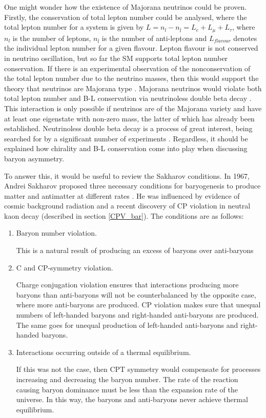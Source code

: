 \documentclass[10pt]{article}
\begin{document}
One might wonder how the existence of Majorana neutrinos could be proven. Firstly, the conservation of total lepton number could be analysed, where the total lepton number for a system is given by $L = n_l - n_{\bar{l}} = L_e + L_{\mu} + L_{\tau}$, where $n_l$ is the number of leptons, $n_{\bar{l}}$ is the number of anti-leptons and $L_{flavour}$ denotes the individual lepton number for a given flavour. Lepton flavour is not conserved in neutrino oscillation, but so far the SM supports total lepton number conservation. If there is an experimental observation of the nonconservation of the total lepton number due to the neutrino masses, then this would support the theory that neutrinos are Majorana type \cite{king2017unified}. Majorana neutrinos would violate both total lepton number and B-L conservation via neutrinoless double beta decay \cite{rodejohann2011neutrino}. This interaction is only possible if neutrinos are of the Majorana variety and have at least one eigenstate with non-zero mass, the latter of which has already been established.  Neutrinoless double beta decay is a process of great interest, being searched for by a significant number of experiments \cite{schwingenheuer2013status, Xu_2015, khanbekov2013amore, Albert_2018}. Regardless, it should be explained how chirality and B-L conservation come into play when discussing baryon asymmetry.

To answer this, it would be useful to review the Sakharov conditions. In 1967, Andrei Sakharov proposed three necessary conditions for baryogenesis to produce matter and antimatter at different rates \cite{sakharov1998violation}. He was influenced by evidence of cosmic background radiation and a recent discovery of CP violation in neutral kaon decay (described in section \ref{CPV_bar}). The conditions are as follows:

\begin{enumerate}
	\item Baryon number violation. 
	
	This is a natural result of producing an excess of baryons over anti-baryons
	
	\item C and CP-symmetry violation.
	
	Charge conjugation violation ensures that interactions producing more baryons than anti-baryons will not be counterbalanced by the opposite case, where more anti-baryons are produced. CP violation makes sure that unequal numbers of left-handed baryons and right-handed anti-baryons are produced. The same goes for unequal production of left-handed anti-baryons and right-handed baryons.
	
	\item Interactions occurring outside of a thermal equilibrium.
	
	If this was not the case, then CPT symmetry would compensate for processes increasing and decreasing the baryon number. The rate of the reaction causing baryon dominance must be less than the expansion rate of the universe. In this way, the baryons and anti-baryons never achieve thermal equilibrium.
\end{enumerate}
\end{document}
